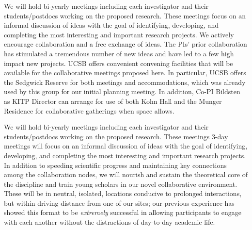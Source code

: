 {\color{green} We will hold bi-yearly meetings including each investigator and their students/postdocs working on the proposed research. These meetings focus on an informal discussion of ideas with the goal of identifying, developing, and completing the most interesting and important research projects. We actively encourage collaboration and a free exchange of ideas. The PIs' prior collaboration has stimulated a tremendous number of new ideas and have led to a few high impact new projects. UCSB offers convenient convening facilities that will be available for the collaborative meetings proposed here. In particular, UCSB offers the Sedgwick Reserve for both meetings and accommodations, which was already used by this group for our initial planning meeting. In addition, Co-PI Bildsten as KITP Director can arrange for use of both Kohn Hall and the Munger Residence for collaborative gatherings when space allows.}

We will hold bi-yearly meetings including each investigator and their students/postdocs working on the proposed research. These meetings 3-day meetings will focus on an informal discussion of ideas with the goal of identifying, developing, and completing the most interesting and important research projects. In addition to speeding scientific progress and maintaining key connections among the collaboration nodes, we will nourish and sustain the theoretical core of the discipline and train young scholars in our novel collaborative environment. These will be in neutral, isolated, locations conducive to prolonged interactions, but within driving distance from one of our sites; our previous experience has showed this format to be \emph{extremely} successful in allowing participants to engage with each another without the distractions of day-to-day academic life. 
